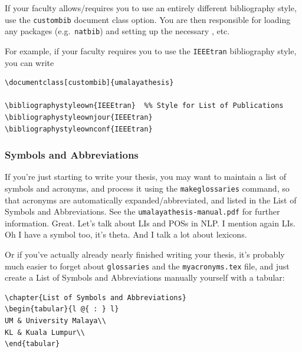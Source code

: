 If your faculty allows/requires you to use an entirely different bibliography style, use the \texttt{custombib} document class option. You are then responsible for loading any packages (e.g.~\texttt{natbib}) and setting up the necessary \verb||, etc.

For example, if your faculty requires you to use the \texttt{IEEEtran} bibliography style, you can write

\begin{lstlisting}[language={[LaTeX]TeX},
emph={\bibliographystyleown,\bibliographystyleownjour,\bibliographystyleownconf},
emphstyle=\bfseries]
\documentclass[custombib]{umalayathesis}

\bibliographystyleown{IEEEtran}  %% Style for List of Publications
\bibliographystyleownjour{IEEEtran}
\bibliographystyleownconf{IEEEtran}
\end{lstlisting}



\subsubsection{Symbols and Abbreviations}

If you're just starting to write your thesis, you may want to maintain a list of symbols and acronyms, and process it using the \texttt{makeglossaries} command, so that acronyms are automatically expanded/abbreviated, and listed in the List of Symbols and Abbreviations. See the \texttt{umalayathesis-manual.pdf} for further information.
Great. Let's talk about \glspl{LI} and \glspl{POS} in \gls{NLP}. I mention again \glspl{LI}. Oh I have a symbol too, it's \gls{theta}. And I talk a lot about \glspl{lexicon}.

Or if you've actually already nearly finished writing your thesis, it's probably much easier to forget about \texttt{glossaries} and the \texttt{myacronyms.tex} file, and just create a List of Symbols and Abbreviations manually yourself with a tabular:

\begin{lstlisting}[language={[LaTeX]TeX},emph={\chapter},emphstyle=\bfseries]
\chapter{List of Symbols and Abbreviations}
\begin{tabular}{l @{ : } l}
UM & University Malaya\\
KL & Kuala Lumpur\\
\end{tabular}
\end{lstlisting}

